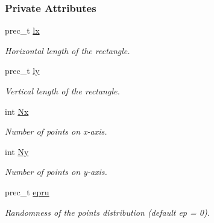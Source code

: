 \subsubsection*{Private Attributes}
\begin{CompactItemize}
\item 
\hypertarget{classPARectangleKnots_48a040f96a10b12d34a9c181f13331a3}{
prec\_\-t \hyperlink{classPARectangleKnots_48a040f96a10b12d34a9c181f13331a3}{lx}}
\label{classPARectangleKnots_48a040f96a10b12d34a9c181f13331a3}

\begin{CompactList}\small\item\em Horizontal length of the rectangle. \item\end{CompactList}\item 
\hypertarget{classPARectangleKnots_a7cce51bed139233f9fba0ff10c8bff8}{
prec\_\-t \hyperlink{classPARectangleKnots_a7cce51bed139233f9fba0ff10c8bff8}{ly}}
\label{classPARectangleKnots_a7cce51bed139233f9fba0ff10c8bff8}

\begin{CompactList}\small\item\em Vertical length of the rectangle. \item\end{CompactList}\item 
\hypertarget{classPARectangleKnots_7aa2db91d316538c1c5745abce3560f5}{
int \hyperlink{classPARectangleKnots_7aa2db91d316538c1c5745abce3560f5}{Nx}}
\label{classPARectangleKnots_7aa2db91d316538c1c5745abce3560f5}

\begin{CompactList}\small\item\em Number of points on x-axis. \item\end{CompactList}\item 
\hypertarget{classPARectangleKnots_858b834f471478645d22157afc0140e7}{
int \hyperlink{classPARectangleKnots_858b834f471478645d22157afc0140e7}{Ny}}
\label{classPARectangleKnots_858b834f471478645d22157afc0140e7}

\begin{CompactList}\small\item\em Number of points on y-axis. \item\end{CompactList}\item 
\hypertarget{classPARectangleKnots_a33cdd9e7792980255460d8e670dc927}{
prec\_\-t \hyperlink{classPARectangleKnots_a33cdd9e7792980255460d8e670dc927}{epru}}
\label{classPARectangleKnots_a33cdd9e7792980255460d8e670dc927}

\begin{CompactList}\small\item\em Randomness of the points distribution (default ep = 0). \item\end{CompactList}\end{CompactItemize}


